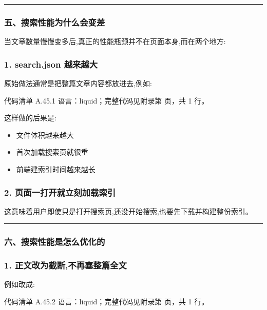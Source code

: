\documentclass[lang=cn,scheme=chinese,color=blue,device=normal,toc=onecol,math=cm]{elegantbook}
\begin{document}
\medskip\hrule\medskip


\subsubsection{五、搜索性能为什么会变差}


当文章数量慢慢变多后,真正的性能瓶颈并不在页面本身,而在两个地方:\par


\subsubsection{1. search.json 越来越大}


原始做法通常是把整篇文章内容都放进去,例如:\par


\begin{codeindexbox}{代码清单 A.45.1}
语言：liquid；完整代码见附录第 \pageref{code:45:1} 页，共 1 行。
\end{codeindexbox}


这样做的后果是:\par


\begin{itemize}
\item 文件体积越来越大
\item 首次加载搜索页就很重
\item 前端建索引时间越来越长
\end{itemize}


\subsubsection{2. 页面一打开就立刻加载索引}


这意味着用户即使只是打开搜索页,还没开始搜索,也要先下载并构建整份索引。\par


\medskip\hrule\medskip


\subsubsection{六、搜索性能是怎么优化的}


\subsubsection{1. 正文改为截断,不再塞整篇全文}


例如改成:\par


\begin{codeindexbox}{代码清单 A.45.2}
语言：liquid；完整代码见附录第 \pageref{code:45:2} 页，共 1 行。
\end{codeindexbox}
\end{document}
